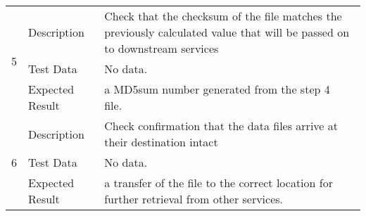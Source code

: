 \begin{longtable}[]{p{1.3cm}p{2cm}p{13cm}}
            \multirow{3}{*}{ 5 } & Description &
            \begin{minipage}[t]{13cm}{\footnotesize
            Check that the checksum of the file matches the previously calculated
value that will be passed on to downstream services

            \vspace{\dp0}
            } \end{minipage} \\ \cline{2-3}
            & Test Data &
            \begin{minipage}[t]{13cm}{\footnotesize
                No data.
                \vspace{\dp0}
            } \end{minipage} \\ \cline{2-3}
            & Expected Result &
                \begin{minipage}[t]{13cm}{\footnotesize
                a MD5sum number generated from the step 4 file.~~

                \vspace{\dp0}
                } \end{minipage}
        \\ \midrule

            \multirow{3}{*}{ 6 } & Description &
            \begin{minipage}[t]{13cm}{\footnotesize
            Check confirmation that the data files arrive at their destination
intact

            \vspace{\dp0}
            } \end{minipage} \\ \cline{2-3}
            & Test Data &
            \begin{minipage}[t]{13cm}{\footnotesize
                No data.
                \vspace{\dp0}
            } \end{minipage} \\ \cline{2-3}
            & Expected Result &
                \begin{minipage}[t]{13cm}{\footnotesize
                a transfer of the file to the correct location for further retrieval
from other services.~~

                \vspace{\dp0}
                } \end{minipage}
        \\ \midrule


\end{longtable}
